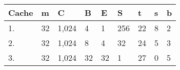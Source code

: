 \documentclass{article}
\begin{document}
\begin{tabular}{l l l l l l l l l}
	Cache & m & C & B & E & S & t & s & b \\
	\hline
	1. & 32 & 1,024 & 4 & 1 & 256 & 22 & 8 & 2 \\
	2. & 32 & 1,024 & 8 & 4 & 32 & 24 & 5 & 3 \\
	3. & 32 & 1,024 & 32 & 32 & 1 & 27 & 0 & 5 \\
\end{tabular}
\end{document}
